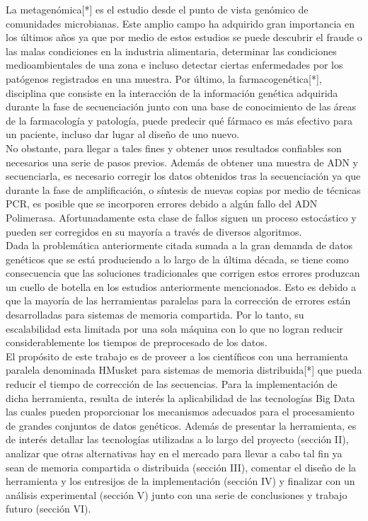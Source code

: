 \documentclass[conference]{IEEEtran}
\begin{document}
La metagenómica[*] es el estudio desde el punto de vista genómico de comunidades microbianas. Este amplio campo ha adquirido gran importancia en los últimos años ya que por medio de estos estudios se puede descubrir el fraude o las malas condiciones en la industria alimentaria, determinar las condiciones medioambientales de una zona e incluso detectar ciertas enfermedades por los patógenos registrados en una muestra. Por último, la farmacogenética[*], disciplina que consiste en la interacción de la información genética adquirida durante la fase de secuenciación junto con una base de conocimiento de las áreas de la farmacología y patología, puede predecir qué fármaco es más efectivo para un paciente, incluso dar lugar al diseño de uno nuevo.
\\

No obstante, para llegar a tales fines y obtener unos resultados confiables son necesarios una serie de pasos previos. Además de obtener una muestra de ADN y secuenciarla, es necesario corregir los datos obtenidos tras la secuenciación ya que durante la fase de amplificación, o síntesis de nuevas copias por medio de técnicas PCR\cite{pcr}, es posible que se incorporen errores debido a algún fallo del ADN Polimerasa\cite{adn_polimerasa}. Afortunadamente esta clase de fallos siguen un proceso estocástico y pueden ser corregidos en su mayoría a través de diversos algoritmos.
\\

Dada la problemática anteriormente citada sumada a la gran demanda de datos genéticos que se está produciendo a lo largo de la última década, se tiene como consecuencia que las soluciones tradicionales que corrigen estos errores produzcan un cuello de botella en los estudios anteriormente mencionados. Esto es debido a que la mayoría de las herramientas paralelas para la corrección de errores están desarrolladas para sistemas de memoria compartida. Por lo tanto, su escalabilidad esta limitada por una sola máquina con lo que no logran reducir considerablemente los tiempos de preprocesado de los datos.
\\

El propósito de este trabajo es de proveer a los científicos con una herramienta paralela denominada HMusket para sistemas de memoria distribuida[*] que pueda reducir el tiempo de corrección de las secuencias. Para la implementación de dicha herramienta, resulta de interés la aplicabilidad de las tecnologías Big Data las cuales pueden proporcionar los mecanismos adecuados para el procesamiento de grandes conjuntos de datos genéticos. Además de presentar la herramienta, es de interés detallar las tecnologías utilizadas a lo largo del proyecto (sección II), analizar que otras alternativas hay en el mercado para llevar a cabo tal fin ya sean de memoria compartida o distribuida (sección III), comentar el diseño de la herramienta y los entresijos de la implementación (sección IV) y finalizar con un análisis experimental (sección V)  junto con una serie de conclusiones y trabajo futuro (sección VI).\\
\end{document}
